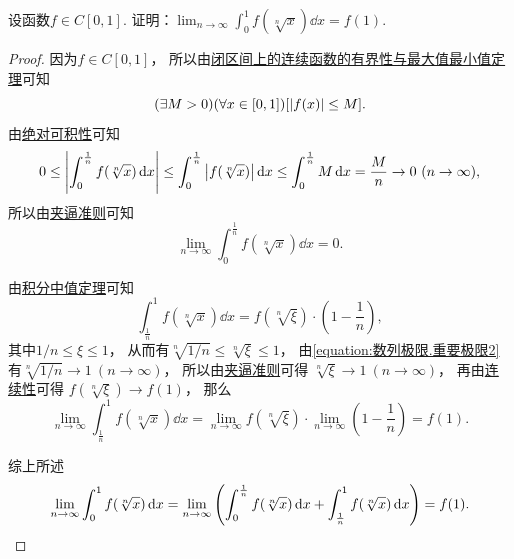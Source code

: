 \begin{example}
设函数\(f \in C[0,1]\).
证明：\(\lim_{n\to\infty} \int_0^1 f(\sqrt[n]{x}) \dd{x} = f(1)\).
\begin{proof}
因为\(f \in C[0,1]\)，
所以由\hyperref[theorem:极限.最值定理]{闭区间上的连续函数的有界性与最大值最小值定理}可知\begin{equation*}
	(\exists M>0)
	(\forall x\in[0,1])
	[\abs{f(x)} \leq M].
\end{equation*}
由\hyperref[theorem:定积分.定积分性质5推论2]{绝对可积性}可知\begin{equation*}
	0 \leq \abs{\int_0^{\frac1n} f(\sqrt[n]{x}) \dd{x}}
	\leq \int_0^{\frac1n} \abs{f(\sqrt[n]{x})} \dd{x}
	\leq \int_0^{\frac1n} M \dd{x}
	= \frac{M}{n}
	\to 0\ (n\to\infty),
\end{equation*}
所以由\hyperref[theorem:数列极限.夹逼准则]{夹逼准则}可知
\begin{equation*}
	\lim_{n\to\infty} \int_0^{\frac1n} f(\sqrt[n]{x}) \dd{x} = 0.
\end{equation*}

由\hyperref[theorem:定积分.积分中值定理1推论2]{积分中值定理}可知\begin{equation*}
	\int_{\frac1n}^1 f(\sqrt[n]{x}) \dd{x}
	= f(\sqrt[n]{\xi}) \cdot \left( 1-\frac1n \right),
\end{equation*}
其中\(1/n \leq \xi \leq 1\)，
从而有\(\sqrt[n]{1/n} \leq \sqrt[n]{\xi} \leq 1\)，
由\cref{equation:数列极限.重要极限2} 有\(\sqrt[n]{1/n} \to 1\ (n\to\infty)\)，
所以由\hyperref[theorem:数列极限.夹逼准则]{夹逼准则}可得
\(\sqrt[n]{\xi} \to 1\ (n\to\infty)\)，
再由\hyperref[theorem:极限.连续函数的极限3]{连续性}可得
\(f(\sqrt[n]{\xi}) \to f(1)\)，
那么\begin{equation*}
	\lim_{n\to\infty} \int_{\frac1n}^1 f(\sqrt[n]{x}) \dd{x}
	= \lim_{n\to\infty} f(\sqrt[n]{\xi})
		\cdot \lim_{n\to\infty} \left( 1-\frac1n \right)
	= f(1).
\end{equation*}

综上所述\begin{equation*}
	\lim_{n\to\infty} \int_0^1 f(\sqrt[n]{x}) \dd{x}
	= \lim_{n\to\infty} \left(
		\int_0^{\frac1n} f(\sqrt[n]{x}) \dd{x}
		+ \int_{\frac1n}^1 f(\sqrt[n]{x}) \dd{x}
	\right)
	= f(1).
	\qedhere
\end{equation*}
\end{proof}
\end{example}

